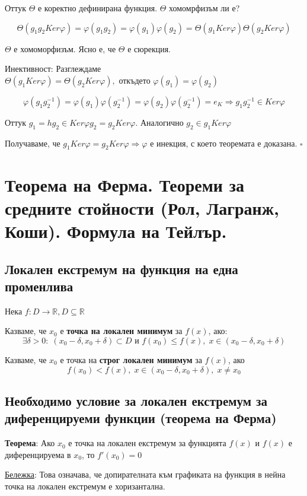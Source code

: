 \documentclass{article}
\renewcommand{\\}{\newline}
\newcommand{\proven}{\hfill $\square$}
\begin{document}
Оттук \(\Theta\) е коректно дефинирана функция. \(\Theta\) хомомрфизъм ли е?

\[
  \Theta(g_1g_2 Ker \varphi) = \varphi(g_1g_2) = \varphi(g_1) \varphi(g_2) = \Theta(g_1 Ker \varphi)\Theta(g_2 Ker \varphi)
\]   

\(\Theta\) е хомоморфизъм. Ясно е, че \(\Theta\) е сюрекция.

Инективност: Разглеждаме \(\Theta(g_1 Ker \varphi) = \Theta(g_2 Ker \varphi),\text{ откъдето }\varphi(g_1) = \varphi(g_2)\) 

\[
  \varphi(g_1g_{2}^{-1}) = \varphi(g_1)\varphi(g_2^{-1}) = \varphi(g_2) \varphi(g_{2}^{-1}) = e_{K} \Rightarrow g_{1}g_2^{-1} \in Ker \varphi
\] 

Оттук \(g_1 = hg_2 \in Ker \varphi g_2 = g_2 Ker \varphi\). Аналогично \(g_2 \in g_1 Ker \varphi\) 

Получаваме, че \(g_1 Ker \varphi = g_2 Ker \varphi \Rightarrow \varphi\)  е инекция, с което теоремата е доказана. \proven
\newpage

\section{Теорема на Ферма. Теореми за средните стойности (Рол, Лагранж, Коши). Формула на Тейлър.}
\subsection{Локален екстремум на функция на една променлива} Нека \(f: D \to \mathbb{R}, D \subseteq \mathbb{R} \)   

Казваме, че \(x_0\) е \textbf{точка на локален минимум} за \(f(x)\), ако:\[
  \exists \delta > 0:\;(x_0 - \delta, x_0 + \delta) \subset D \text{ и }f(x_0) \leq f(x),\; x \in \left(x_0 - \delta, x_0  +\delta\right)
\]  

Казваме, че \(x_0\) е точка на \textbf{строг локален минимум} за \(f(x)\), ако \[
  f(x_0) < f(x),\; x \in (x_0 - \delta, x_0 + \delta),\; x \not= x_0
\]   
\subsection{Необходимо условие за локален екстремум за диференцируеми функции (теорема на Ферма)}

\textbf{Теорема}: Ако \(x_0\) е точка на локален екстремум за функцията \(f(x)\) и \(f(x)\) е диференцируема в \(x_0\), то \(f'(x_0) = 0\)

\underline{Бележка}: Това означава, че допирателната към графиката на функция в нейна точка на локален екстремум е хоризантална. 
\end{document}
